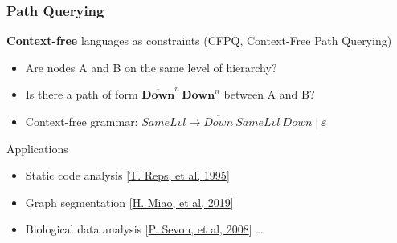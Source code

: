 \documentclass[xcolor=table,aspectratio=169]{beamer}
\begin{document}
\begin{frame}[fragile]
  \frametitle{Path Querying}  
  \begin{minipage}[m]{0.45\linewidth}
    \end{minipage}\hfill
    \begin{minipage}[m]{0.5\linewidth}
    \textbf{Context-free} languages as constraints (CFPQ, Context-Free Path Querying)
    \begin{itemize}
          \item Are nodes A and B on the same level of hierarchy?
          \item Is there a path of form $\overline{\textbf{Down}}^n \, \textbf{Down}^n$ between A and B?
          \item Context-free grammar: $\textit{SameLvl} \to \overline{\textit{Down}} \ \textit{SameLvl} \ \textit{Down} \mid \varepsilon$
    \end{itemize}
    \pause
  
    \vspace{0.3cm}
  
  
    Applications
      \begin{itemize}
        \item Static code analysis [\href{https://dl.acm.org/doi/10.1145/199448.199462}{T. Reps, et al, 1995}]
        \item Graph segmentation [\href{https://dblp.org/rec/conf/icde/0001D19.html}{H. Miao, et al, 2019}]
        \item Biological data analysis [\href{https://pubmed.ncbi.nlm.nih.gov/20134073/}{P. Sevon, et al, 2008}] \ldots
      \end{itemize}
  
    \end{minipage}
  
\end{frame}
\end{document}
